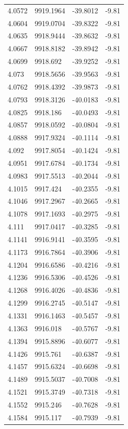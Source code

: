 \begin{table}[H]
\begin{tabular}{llll}
4.0572 & 9919.1964 & -39.8012 & -9.81 \\
4.0604 & 9919.0704 & -39.8322 & -9.81 \\
4.0635 & 9918.9444 & -39.8632 & -9.81 \\
4.0667 & 9918.8182 & -39.8942 & -9.81 \\
4.0699 & 9918.692 & -39.9252 & -9.81 \\
4.073 & 9918.5656 & -39.9563 & -9.81 \\
4.0762 & 9918.4392 & -39.9873 & -9.81 \\
4.0793 & 9918.3126 & -40.0183 & -9.81 \\
4.0825 & 9918.186 & -40.0493 & -9.81 \\
4.0857 & 9918.0592 & -40.0804 & -9.81 \\
4.0888 & 9917.9324 & -40.1114 & -9.81 \\
4.092 & 9917.8054 & -40.1424 & -9.81 \\
4.0951 & 9917.6784 & -40.1734 & -9.81 \\
4.0983 & 9917.5513 & -40.2044 & -9.81 \\
4.1015 & 9917.424 & -40.2355 & -9.81 \\
4.1046 & 9917.2967 & -40.2665 & -9.81 \\
4.1078 & 9917.1693 & -40.2975 & -9.81 \\
4.111 & 9917.0417 & -40.3285 & -9.81 \\
4.1141 & 9916.9141 & -40.3595 & -9.81 \\
4.1173 & 9916.7864 & -40.3906 & -9.81 \\
4.1204 & 9916.6586 & -40.4216 & -9.81 \\
4.1236 & 9916.5306 & -40.4526 & -9.81 \\
4.1268 & 9916.4026 & -40.4836 & -9.81 \\
4.1299 & 9916.2745 & -40.5147 & -9.81 \\
4.1331 & 9916.1463 & -40.5457 & -9.81 \\
4.1363 & 9916.018 & -40.5767 & -9.81 \\
4.1394 & 9915.8896 & -40.6077 & -9.81 \\
4.1426 & 9915.761 & -40.6387 & -9.81 \\
4.1457 & 9915.6324 & -40.6698 & -9.81 \\
4.1489 & 9915.5037 & -40.7008 & -9.81 \\
4.1521 & 9915.3749 & -40.7318 & -9.81 \\
4.1552 & 9915.246 & -40.7628 & -9.81 \\
4.1584 & 9915.117 & -40.7939 & -9.81 \\

\end{tabular}
\end{table}
